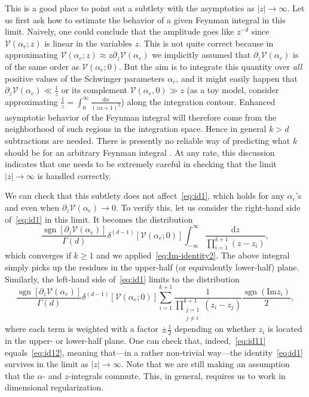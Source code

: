 \documentclass[12pt]{article}
\numberwithin{figure}{section}
\DeclareMathOperator{\sgn}{sgn}
\def \be {\begin{equation}}
\def \ee {\end{equation}}
\def \d {\mathrm{d}}
\def \V {\mathcal{V}}
\def \geq {\geqslant}
\def \Im {\mathrm{Im}}
\begin{document}
    This is a good place to point out a subtlety with the asymptotics as $|z| \to \infty$. Let us first ask how to estimate the behavior of a given Feynman integral in this limit. Naively, one could conclude that the amplitude goes like $z^{-d}$ since $\V(\alpha_e;z)$ is linear in the variables $z$. This is not quite correct because in approximating $\V(\alpha_e; z) \approx z \partial_z \V(\alpha_e)$ we implicitly assumed that $\partial_z \V(\alpha_e)$ is of the same order as $\V(\alpha_e;0)$. But the aim is to integrate this quantity over \emph{all} positive values of the Schwinger parameters $\alpha_e$, and it might easily happen that $\partial_z\V(\alpha_e) \ll \tfrac{1}{z}$ or its complement $\V(\alpha_e,0) \gg z$ (as a toy model, consider approximating $\frac{1}{z} = \int_{0}^{\infty}\!\frac{\d \alpha}{(z\alpha + 1)^2}$) along the integration contour. Enhanced asymptotic behavior of the Feynman integral will therefore come from the neighborhood of such regions in the integration space. Hence in general $k>d$ subtractions are needed. There is presently no reliable way of predicting what $k$ should be for an arbitrary Feynman integral \cite{doi:10.1063/1.1703983,cmp/1103904351,doi:10.1063/1.1703919,doi:10.1063/1.1703918,doi:10.1063/1.523857,PhysRev.131.480,PhysRev.131.2373,Lam:1969xs}. At any rate, this discussion indicates that one needs to be extremely careful in checking that the limit $|z| \to \infty$ is handled correctly.
    
    We can check that this subtlety does not affect~\eqref{eq:id1}, which holds for any $\alpha_e$'s and even when $\partial_z \V(\alpha_e) \to 0$. To verify this, let us consider the right-hand side of~\eqref{eq:id1} in this limit. It becomes the distribution
    \be\label{eq:id11}
    \frac{\sgn[\partial_z \V(\alpha_e)]}{\Gamma(d)} \delta^{(d-1)}[\V(\alpha_e;0)] \int_{-\infty}^{\infty} \frac{\d z}{\prod_{i=1}^{k+1} (z - z_i)},
    \ee
    which converges if $k \geq 1$ and we applied~\eqref{eq:Im-identity2}. The above integral simply picks up the residues in the upper-half (or equivalently lower-half) plane. Similarly, the left-hand side of~\eqref{eq:id1} limits to the distribution
    \be\label{eq:id12}
    \frac{\sgn[\partial_z \V(\alpha_e)]}{\Gamma(d)} \delta^{(d-1)}[\V(\alpha_e; 0)] \sum_{i=1}^{k+1} \frac{1}{\prod_{\substack{j=1\\ j\neq i}}^{k+1} (z_i - z_j)} \frac{\sgn(\Im z_i )}{2},
    \ee
    where each term is weighted with a factor $\pm \tfrac{1}{2}$ depending on whether $z_i$ is located in the upper- or lower-half plane. One can check that, indeed,~\eqref{eq:id11} equals~\eqref{eq:id12}, meaning that---in a rather non-trivial way---the identity~\eqref{eq:id1} survives in the limit as $|z| \to \infty$. Note that we are still making an assumption that the $\alpha$- and $z$-integrals commute. This, in general, requires us to work in dimensional regularization.
    
\end{document}
